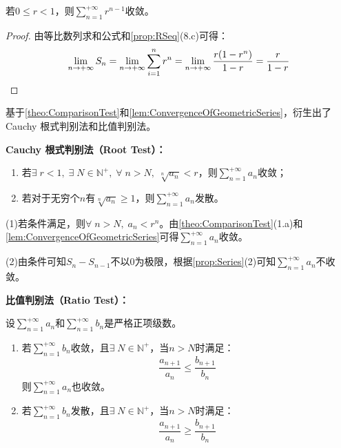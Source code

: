 \begin{lemma}\label{lem:ConvergenceOfGeometricSeries}
	若$0\leqslant r<1$，则$\sum\limits_{n=1}^{+\infty}r^{n-1}$收敛。
\end{lemma}
\begin{proof}
	由等比数列求和公式和\cref{prop:RSeq}(8.c)可得：
	\begin{equation*}
		\lim_{n\to+\infty}S_n=\lim_{n\to+\infty}\sum_{i=1}^{n}r^n=\lim_{n\to+\infty}\frac{r(1-r^n)}{1-r}=\frac{r}{1-r}\qedhere
	\end{equation*}
\end{proof}
\begin{note}
	基于\cref{theo:ComparisonTest}和\cref{lem:ConvergenceOfGeometricSeries}，衍生出了Cauchy 根式判别法和比值判别法。\par
	\textbf{Cauchy 根式判别法（Root Test）：}\par
	\begin{enumerate}
		\item 若$\exists\;r<1,\;\exists\;N\in\mathbb{N}^+,\;\forall\;n>N,\;\sqrt[n]{a_n}<r$，则$\sum\limits_{n=1}^{+\infty}a_n$收敛；
		\item 若对于无穷个$n$有$\sqrt[n]{a_n}\geqslant1$，则$\sum\limits_{n=1}^{+\infty}a_n$发散。
	\end{enumerate}\par
	(1)若条件满足，则$\forall\;n>N,\;a_n<r^n$。由\cref{theo:ComparisonTest}(1.a)和\cref{lem:ConvergenceOfGeometricSeries}可得$\sum\limits_{n=1}^{+\infty}a_n$收敛。\par
	(2)由条件可知$S_n-S_{n-1}$不以$0$为极限，根据\cref{prop:Series}(2)可知$\sum\limits_{n=1}^{+\infty}a_n$不收敛。\par
	\textbf{比值判别法（Ratio Test）：}\par
	设$\sum\limits_{n=1}^{+\infty}a_n$和$\sum\limits_{n=1}^{+\infty}b_n$是严格正项级数。
	\begin{enumerate}
		\item 若$\sum\limits_{n=1}^{+\infty}b_n$收敛，且$\exists\;N\in\mathbb{N}^+$，当$n>N$时满足：
		\begin{equation*}
			\frac{a_{n+1}}{a_n}\leqslant\frac{b_{n+1}}{b_n}
		\end{equation*}
		则$\sum\limits_{n=1}^{+\infty}a_n$也收敛。
		\item 若$\sum\limits_{n=1}^{+\infty}b_n$发散，且$\exists\;N\in\mathbb{N}^+$，当$n>N$时满足：
		\begin{equation*}
			\frac{a_{n+1}}{a_n}\geqslant\frac{b_{n+1}}{b_n}
		\end{equation*}

\end{enumerate}
\end{note}
